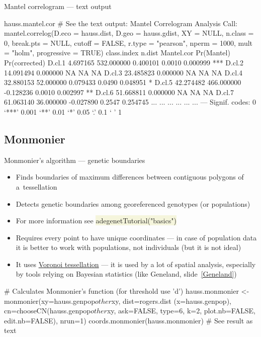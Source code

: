 \documentclass[compress, xelatex, 11pt, xcolor=svgnames, aspectratio=169, url={hyphens, lowtilde}]{beamer}
\renewcommand{\texttt}[1]{\colorbox{Beige}{{\ttfamily #1}}}
\begin{document}
\begin{frame}[fragile]{Mantel correlogram --- text output}
	\begin{spluscode}
    hauss.mantel.cor # See the text output:
    Mantel Correlogram Analysis
    Call:
    mantel.correlog(D.eco = hauss.dist, D.geo = hauss.gdist, XY = NULL,
      n.class = 0, break.pts = NULL, cutoff = FALSE, r.type = "pearson",
      nperm = 1000, mult = "holm", progressive = TRUE)
            class.index     n.dist Mantel.cor Pr(Mantel) Pr(corrected)
    D.cl.1     4.697165 532.000000   0.400101     0.0010      0.000999 ***
    D.cl.2    14.091494   0.000000         NA         NA            NA
    D.cl.3    23.485823   0.000000         NA         NA            NA
    D.cl.4    32.880153  52.000000   0.079433     0.0490      0.048951 *
    D.cl.5    42.274482 466.000000  -0.128236     0.0010      0.002997 **
    D.cl.6    51.668811   0.000000         NA         NA            NA
    D.cl.7    61.063140  36.000000  -0.027890     0.2547      0.254745
       ...          ...        ...        ...        ...           ...
    ---
    Signif. codes:  0 ‘***’ 0.001 ‘**’ 0.01 ‘*’ 0.05 ‘.’ 0.1 ‘ ’ 1
	\end{spluscode}
\end{frame}

\subsection{Monmonier}

\begin{frame}[fragile]{Monmonier's algorithm --- genetic boundaries}
	\begin{itemize}
		\item Finds boundaries of maximum differences between contiguous polygons of a~tessellation
		\item Detects genetic boundaries among georeferenced genotypes (or populations)
		\item For more information see \texttt{adegenetTutorial("basics")}
		\item Requires every point to have unique coordinates --- in case of population data it is better to work with populations, not individuals (but it is not ideal)
		\item It uses \href{https://en.wikipedia.org/wiki/Voronoi_diagram}{Voronoi tessellation} --- it is used by a lot of spatial analysis, especially by tools relying on Bayesian statistics (like Geneland, slide~\ref{Geneland})
	\end{itemize}
	\begin{spluscode}
    # Calculates Monmonier's function (for threshold use 'd')
    hauss.monmonier <- monmonier(xy=hauss.genpop$other$xy, dist=rogers.dist
      (x=hauss.genpop), cn=chooseCN(hauss.genpop$other$xy, ask=FALSE, type=6,
      k=2, plot.nb=FALSE, edit.nb=FALSE), nrun=1)
    coords.monmonier(hauss.monmonier) # See result as text
	\end{spluscode}
\end{frame}
\end{document}
